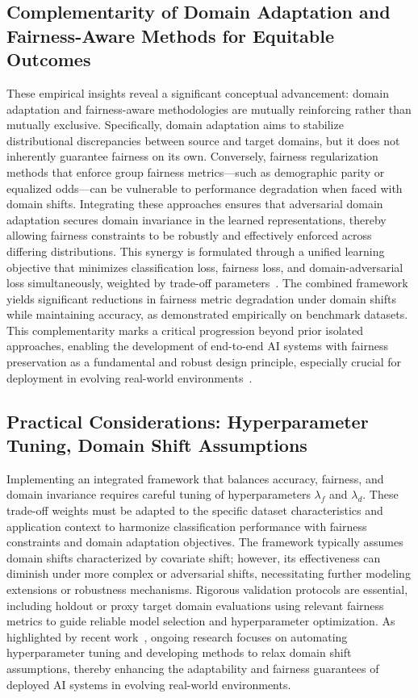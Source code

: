\documentclass[sigconf]{acmart}
\begin{document}
\subsection{Complementarity of Domain Adaptation and Fairness-Aware Methods for Equitable Outcomes}

These empirical insights reveal a significant conceptual advancement: domain adaptation and fairness-aware methodologies are mutually reinforcing rather than mutually exclusive. Specifically, domain adaptation aims to stabilize distributional discrepancies between source and target domains, but it does not inherently guarantee fairness on its own. Conversely, fairness regularization methods that enforce group fairness metrics—such as demographic parity or equalized odds—can be vulnerable to performance degradation when faced with domain shifts. Integrating these approaches ensures that adversarial domain adaptation secures domain invariance in the learned representations, thereby allowing fairness constraints to be robustly and effectively enforced across differing distributions. This synergy is formulated through a unified learning objective that minimizes classification loss, fairness loss, and domain-adversarial loss simultaneously, weighted by trade-off parameters~\cite{ref26}. The combined framework yields significant reductions in fairness metric degradation under domain shifts while maintaining accuracy, as demonstrated empirically on benchmark datasets. This complementarity marks a critical progression beyond prior isolated approaches, enabling the development of end-to-end AI systems with fairness preservation as a fundamental and robust design principle, especially crucial for deployment in evolving real-world environments~\cite{ref26}.

\subsection{Practical Considerations: Hyperparameter Tuning, Domain Shift Assumptions}

Implementing an integrated framework that balances accuracy, fairness, and domain invariance requires careful tuning of hyperparameters \(\lambda_f\) and \(\lambda_d\). These trade-off weights must be adapted to the specific dataset characteristics and application context to harmonize classification performance with fairness constraints and domain adaptation objectives. The framework typically assumes domain shifts characterized by covariate shift; however, its effectiveness can diminish under more complex or adversarial shifts, necessitating further modeling extensions or robustness mechanisms. Rigorous validation protocols are essential, including holdout or proxy target domain evaluations using relevant fairness metrics to guide reliable model selection and hyperparameter optimization. As highlighted by recent work~\cite{ref26}, ongoing research focuses on automating hyperparameter tuning and developing methods to relax domain shift assumptions, thereby enhancing the adaptability and fairness guarantees of deployed AI systems in evolving real-world environments.
\end{document}
